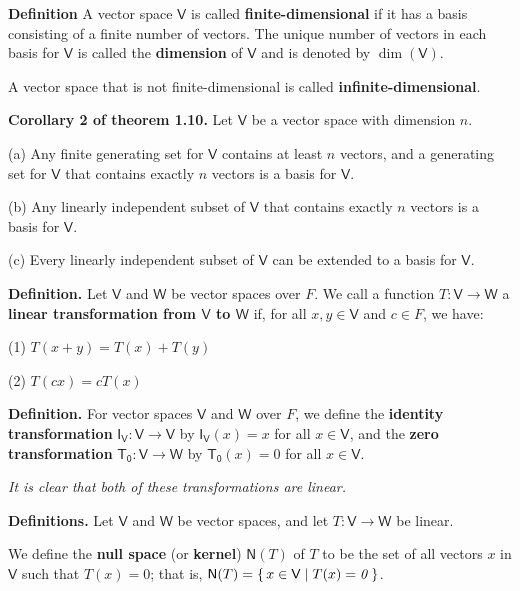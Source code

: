 \documentclass{article}
\newcommand{\0}{\mathit{0}}
\begin{document}
\medskip

\textbf{Definition}
A vector space $\mathsf{V}$ is called \textbf{finite-dimensional} if it has a basis
consisting of a finite number of vectors. The unique number of vectors in each
basis for $\mathsf{V}$ is called the \textbf{dimension} of $\mathsf{V}$ and is denoted
by $\dim(\mathsf{V})$.

A vector space that is not finite-dimensional is called \textbf{infinite-dimensional}.

\medskip

\textbf{Corollary 2 of theorem 1.10.} Let $\mathsf{V}$ be a vector space with dimension $n$.

(a) Any finite generating set for $\mathsf{V}$ contains at least $n$ vectors,
and a generating set for $\mathsf{V}$ that contains exactly $n$ vectors
is a basis for $\mathsf{V}$.

(b) Any linearly independent subset of $\mathsf{V}$ that contains exactly
$n$ vectors is a basis for $\mathsf{V}$.

(c) Every linearly independent subset of $\mathsf{V}$ can be extended to
a basis for $\mathsf{V}$.

\medskip

\textbf{Definition.}
Let $\mathsf{V}$ and $\mathsf{W}$ be vector spaces over $F$. We call a function
$T: \mathsf{V} \to \mathsf{W}$ a \textbf{linear transformation from $\mathsf{V}$ to $\mathsf{W}$} if,
for all $x, y \in \mathsf{V}$ and $c \in F$, we have:

(1) $T(x + y) = T(x) + T(y)$

(2) $T(cx) = cT(x)$

\medskip

\textbf{Definition.} For vector spaces $\mathsf{V}$ and $\mathsf{W}$ over $F$, we define the 
\textbf{identity transformation} $\mathsf{I_V}: \mathsf{V} \to \mathsf{V}$ 
by $\mathsf{I_V}(x) = x$ for all $x \in \mathsf{V}$, 
and the \textbf{zero transformation} $\mathsf{T_0}: \mathsf{V} \to \mathsf{W}$ 
by $\mathsf{T_0}(x) = \0$ for all $x \in \mathsf{V}$. 

\textsl{It is clear that both of these transformations are linear.}

\medskip

\textbf{Definitions.} Let $\mathsf{V}$ and $\mathsf{W}$ be vector spaces, and let 
$T: \mathsf{V} \to \mathsf{W}$ be linear. 

We define the \textbf{null space} (or \textbf{kernel}) $\mathsf{N}(T)$ of $T$ to be the set of all vectors 
$x$ in $\mathsf{V}$ such that $T(x) = \0$; that is, 
$\mathsf{N}(T) = \set{x \in \mathsf{V} \mid T(x) = \0}$. 
\end{document}
